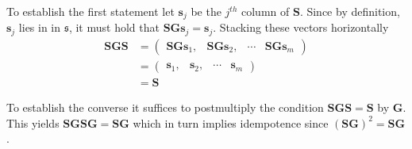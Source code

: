 \documentclass[12pt]{article}
\theoremstyle{definition}
\theoremstyle{property}
\begin{document}
	To establish the first statement let $\bm{s}_j$ be the $j^{th}$ column of $\bm{S}$.  Since by definition, $\bm{s}_j$ lies in in $\mathfrak{s}$, it must hold that $\bm{S}\bm{G}\bm{s}_j=\bm{s}_j$.  Stacking these vectors horizontally
	\begin{align}
	\bm{S}\bm{G}\bm{S}&=\begin{pmatrix}
	\bm{S}\bm{G}\bm{s}_1, & \bm{S}\bm{G}\bm{s}_2, & \cdots & \bm{S}\bm{G}\bm{s}_m
	\end{pmatrix}\\
	&=\begin{pmatrix}
	\bm{s}_1, & \bm{s}_2, & \cdots & \bm{s}_m
	\end{pmatrix}\\
	&=\bm{S}
	\end{align}
	
	To establish the converse it suffices to postmultiply the condition $\bm{S}\bm{G}\bm{S}=\bm{S}$ by $\bm{G}$.  This yields $\bm{S}\bm{G}\bm{S}\bm{G}=\bm{S}\bm{G}$ which in turn implies idempotence since $(\bm{S}\bm{G})^2=\bm{S}\bm{G}$.
	
	\newpage
	

	
	
	
	
	
\end{document}
